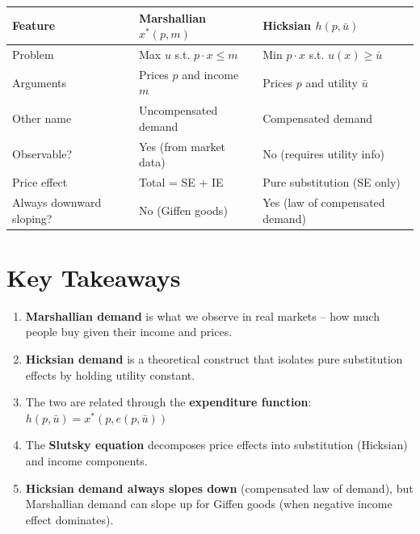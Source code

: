 \documentclass[11pt]{article}
\begin{document}
\begin{center}
\begin{tabular}{|l|l|l|}
\hline
\textbf{Feature} & \textbf{Marshallian $x^*(p,m)$} & \textbf{Hicksian $h(p,\bar{u})$} \\
\hline
Problem & Max $u$ s.t. $p \cdot x \leq m$ & Min $p \cdot x$ s.t. $u(x) \geq \bar{u}$ \\
Arguments & Prices $p$ and income $m$ & Prices $p$ and utility $\bar{u}$ \\
Other name & Uncompensated demand & Compensated demand \\
Observable? & Yes (from market data) & No (requires utility info) \\
Price effect & Total = SE + IE & Pure substitution (SE only) \\
Always downward sloping? & No (Giffen goods) & Yes (law of compensated demand) \\
\hline
\end{tabular}
\end{center}

\section{Key Takeaways}

\begin{enumerate}
    \item \textbf{Marshallian demand} is what we observe in real markets -- how much people buy given their income and prices.

    \item \textbf{Hicksian demand} is a theoretical construct that isolates pure substitution effects by holding utility constant.

    \item The two are related through the \textbf{expenditure function}: $h(p, \bar{u}) = x^*(p, e(p, \bar{u}))$

    \item The \textbf{Slutsky equation} decomposes price effects into substitution (Hicksian) and income components.

    \item \textbf{Hicksian demand always slopes down} (compensated law of demand), but Marshallian demand can slope up for Giffen goods (when negative income effect dominates).
\end{enumerate}
\end{document}

